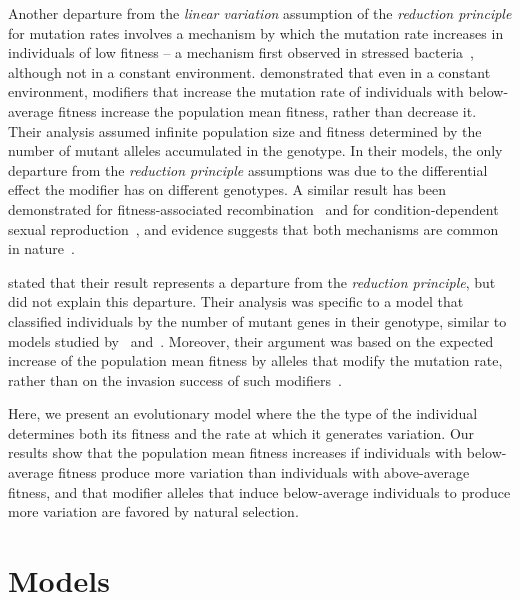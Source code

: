 \documentclass[9pt, a4paper, twocolumn]{extarticle}
\begin{document}
Another departure from the \emph{linear variation} assumption of the \emph{reduction principle} for mutation rates involves a mechanism by which the mutation rate increases in individuals of low fitness -- a mechanism first observed in stressed bacteria~\citep{Foster2007}, although not in a constant environment.
\citet{Ram2012} demonstrated that even in a constant environment, modifiers that increase the mutation rate of individuals with below-average fitness increase the population mean fitness, rather than decrease it.
Their analysis assumed  infinite population size and fitness  determined by the number of mutant alleles accumulated in the genotype.
In their models, the only departure from the \emph{reduction principle} assumptions was due to the differential effect the modifier has on different genotypes.
A similar result has been demonstrated for fitness-associated recombination~\citep{Hadany2003a} and for condition-dependent sexual reproduction~\citep{Hadany2007a}, and evidence suggests that both mechanisms are common in nature~\citep{Ram2016}.

\citet{Ram2012} stated that their result represents a departure from the \emph{reduction principle}, but did not explain this departure.
Their analysis was specific to a model that classified individuals by the number of mutant genes in their genotype, similar to models studied by~\citet{Kimura1966a} and~\citet{Haigh1978}.
Moreover, their argument was based on the expected increase of the population mean fitness by alleles that modify the mutation rate, rather than on the invasion success of such modifiers~\citep[i.e., analysis of \emph{evolutionary genetic stability}, see][]{Eshel1982, Lessard1990}.

Here, we present an evolutionary model where the the type of the individual determines both its fitness and the rate at which it generates variation.
Our results show that the population mean fitness increases if individuals with below-average fitness produce more variation than individuals with above-average fitness,
and that modifier alleles that induce below-average individuals to produce more variation are favored by natural selection.

\section*{Models}
\end{document}
